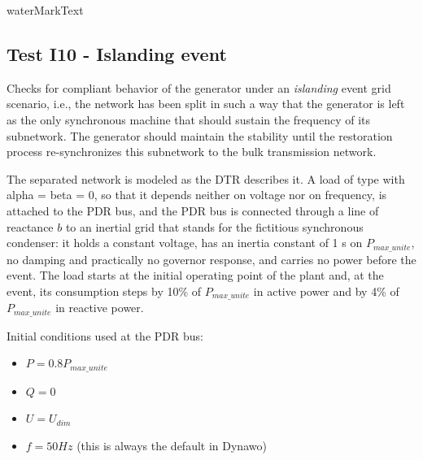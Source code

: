     {{ waterMarkText }}

    \renewcommand{\DTRPcs}{Islanding} %
    \renewcommand{\PCSname}{PCS_RTE-I16z3}
    \renewcommand{\OCname}{DeltaP10DeltaQ4}


    \subsection{Test I10 - Islanding event}

    Checks for compliant behavior of the generator under an
    \emph{islanding} event grid scenario, i.e., the network has been split in
    such a way that the generator is left as the only synchronous machine
    that should sustain the frequency of its subnetwork. The generator
    should maintain the stability until the restoration process
    re-synchronizes this subnetwork to the bulk transmission network.

    \GridCircuitZthree

    The separated network is modeled as the DTR describes it. A load of type
     with alpha = beta = 0, so that it depends neither on
    voltage nor on frequency, is attached to the PDR bus, and the PDR bus is
    connected through a line of reactance $b$ to an inertial grid that stands
    for the fictitious synchronous condenser: it holds a constant voltage, has
    an inertia constant of 1 s on $P_{max\_unite}$, no damping and practically
    no governor response, and carries no power before the event. The load
    starts at the initial operating point of the plant and, at the event, its
    consumption steps by 10\% of $P_{max\_unite}$ in active power and by 4\%
    of $P_{max\_unite}$ in reactive power.

    \begin{description}
        \item Initial conditions used at the PDR bus:
        \begin{itemize}
            \item $P = 0.8 P_{max\_unite}$
            \item $Q = 0$
            \item $U = U_{dim}$
            \item $f = 50 Hz$ (this is always the default in Dynawo)
        \end{itemize}
    \end{description}

